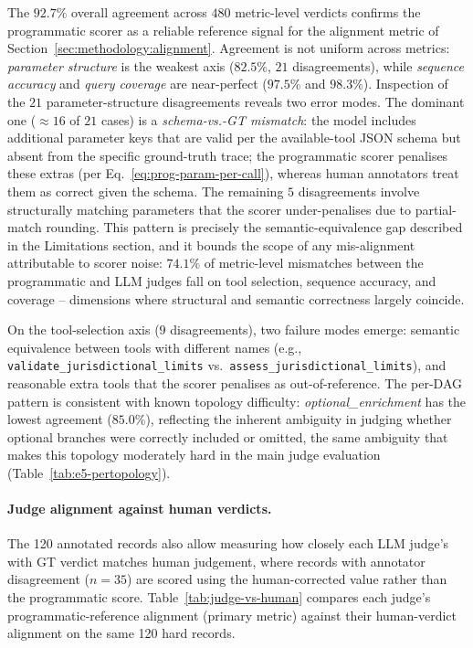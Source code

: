The $92.7\%$ overall agreement across $480$ metric-level verdicts confirms the programmatic scorer as a reliable reference signal for the alignment metric of Section~\ref{sec:methodology:alignment}. Agreement is not uniform across metrics: \emph{parameter structure} is the weakest axis ($82.5\%$, $21$ disagreements), while \emph{sequence accuracy} and \emph{query coverage} are near-perfect ($97.5\%$ and $98.3\%$). Inspection of the $21$ parameter-structure disagreements reveals two error modes. The dominant one (${\approx}16$ of $21$ cases) is a \emph{schema-vs.-GT mismatch}: the model includes additional parameter keys that are valid per the available-tool JSON schema but absent from the specific ground-truth trace; the programmatic scorer penalises these extras (per Eq.~\ref{eq:prog-param-per-call}), whereas human annotators treat them as correct given the schema. The remaining $5$ disagreements involve structurally matching parameters that the scorer under-penalises due to partial-match rounding. This pattern is precisely the semantic-equivalence gap described in the Limitations section, and it bounds the scope of any mis-alignment attributable to scorer noise: $74.1\%$ of metric-level mismatches between the programmatic and LLM judges fall on tool selection, sequence accuracy, and coverage -- dimensions where structural and semantic correctness largely coincide.

On the tool-selection axis ($9$ disagreements), two failure modes emerge: semantic equivalence between tools with different names (e.g., \texttt{validate\_jurisdictional\_limits} vs.\ \texttt{assess\_jurisdictional\_limits}), and reasonable extra tools that the scorer penalises as out-of-reference. The per-DAG pattern is consistent with known topology difficulty: \emph{optional\_enrichment} has the lowest agreement ($85.0\%$), reflecting the inherent ambiguity in judging whether optional branches were correctly included or omitted, the same ambiguity that makes this topology moderately hard in the main judge evaluation (Table~\ref{tab:e5-pertopology}).

\paragraph{Judge alignment against human verdicts.}
The 120 annotated records also allow measuring how closely each LLM judge's with GT verdict matches human judgement, where records with annotator disagreement ($n{=}35$) are scored using the human-corrected value rather than the programmatic score. Table~\ref{tab:judge-vs-human} compares each judge's programmatic-reference alignment (primary metric) against their human-verdict alignment on the same 120 hard records.

